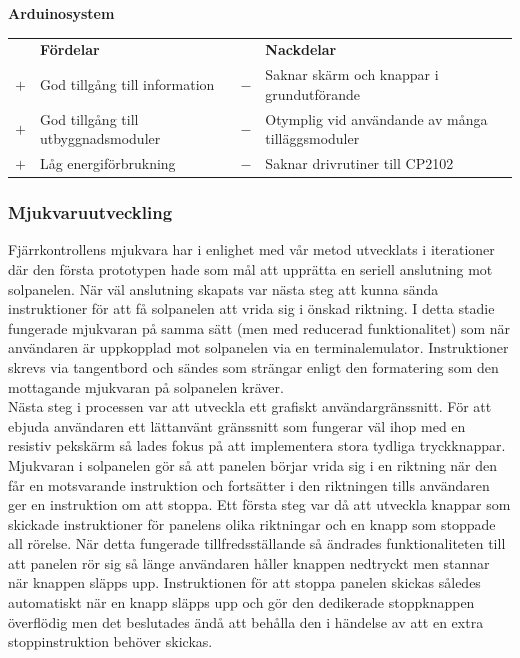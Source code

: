 \documentclass{article}
\begin{document}
            \noindent\textsf{\textbf{Arduinosystem}} \\ 
            \begin{tabularx}{\textwidth}{@{}cXcX} 
                & \textbf{Fördelar}     & & \textbf{Nackdelar} \\
                $+$ & God tillgång till information & 
                                        $-$ & Saknar skärm och knappar i 
                                            grundutförande \\
                $+$ & God tillgång till utbyggnads\-moduler & 
                                        $-$ & Otymplig vid användande av   
                                            många tilläggsmoduler \\
                $+$ & Låg energiförbrukning &
                                        $-$ & Saknar drivrutiner till CP2102 \\

            \end{tabularx}

            \subsubsection{Mjukvaruutveckling} %
            \label{subsub:mjukvaruutveckling}
            Fjärrkontrollens mjukvara har i enlighet med vår metod utvecklats i iterationer där den första prototypen hade som mål att upprätta en seriell anslutning mot solpanelen.
            När väl anslutning skapats var nästa steg att kunna sända instruktioner för att få solpanelen att vrida sig i önskad riktning. I detta stadie fungerade mjukvaran på samma sätt (men med reducerad funktionalitet) som när användaren är uppkopplad mot solpanelen via en terminalemulator. Instruktioner skrevs via tangentbord och sändes som strängar enligt den formatering som den mottagande mjukvaran på solpanelen kräver. \\

            \noindent Nästa steg i processen var att utveckla ett grafiskt användargränssnitt. För att ebjuda användaren ett lättanvänt gränssnitt som fungerar väl ihop med en resistiv pekskärm
            så lades fokus på att implementera stora tydliga tryckknappar. 
            Mjukvaran i solpanelen gör så att panelen börjar vrida sig i en riktning när den får en motsvarande instruktion och fortsätter i den riktningen tills användaren ger en instruktion om att stoppa. Ett första steg var då att utveckla knappar som skickade instruktioner för panelens olika riktningar och en knapp som stoppade all rörelse.
            När detta fungerade tillfredsställande så ändrades funktionaliteten till att panelen rör sig så länge användaren håller knappen nedtryckt men stannar när knappen släpps upp.
            Instruktionen för att stoppa panelen skickas således automatiskt när en knapp släpps upp och gör den dedikerade stoppknappen överflödig men det beslutades ändå att behålla den i händelse av att en extra stoppinstruktion behöver skickas. \\
\end{document}
